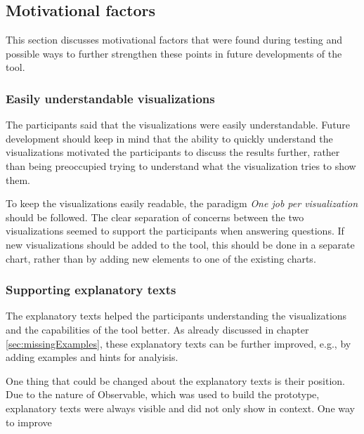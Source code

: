 \subsection{Motivational factors}
This section discusses motivational factors that were found during testing and possible ways to further strengthen these points in future developments of the tool.

\subsubsection*{Easily understandable visualizations}
The participants said that the visualizations were easily understandable. Future development should keep in mind that the ability to quickly understand the visualizations motivated the participants to discuss the results further, rather than being preoccupied trying to understand what the visualization tries to show them.

To keep the visualizations easily readable, the paradigm \emph{One job per visualization} should be followed. The clear separation of concerns between the two visualizations seemed to support the participants when answering questions. If new visualizations should be added to the tool, this should be done in a separate chart, rather than by adding new elements to one of the existing charts.

\subsubsection*{Supporting explanatory texts}
The explanatory texts helped the participants understanding the visualizations and the capabilities of the tool better. As already discussed in chapter \ref{sec:missingExamples}, these explanatory texts can be further improved, e.g., by adding examples and hints for analyisis.

One thing that could be changed about the explanatory texts is their position. Due to the nature of Observable, which was used to build the prototype, explanatory texts were always visible and did not only show in context. One way to improve 